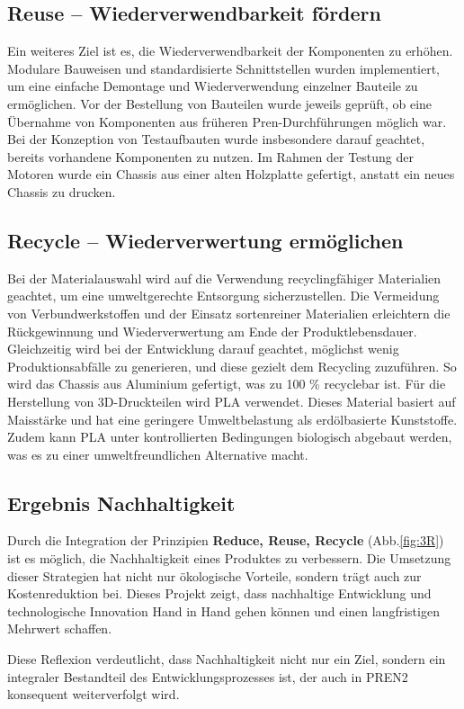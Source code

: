 \documentclass[../main.tex]{subfiles}
\begin{document}
\subsection{Reuse – Wiederverwendbarkeit fördern}

Ein weiteres Ziel ist es, die Wiederverwendbarkeit der Komponenten zu erhöhen. Modulare Bauweisen und standardisierte Schnittstellen wurden implementiert, um eine einfache Demontage und Wiederverwendung einzelner Bauteile zu ermöglichen. Vor der Bestellung von Bauteilen wurde jeweils geprüft, ob eine Übernahme von Komponenten aus früheren Pren-Durchführungen möglich war. Bei der Konzeption von Testaufbauten wurde insbesondere darauf geachtet, bereits vorhandene Komponenten zu nutzen. Im Rahmen der Testung der Motoren wurde ein Chassis aus einer alten Holzplatte gefertigt, anstatt ein neues Chassis zu drucken.

\subsection{Recycle – Wiederverwertung ermöglichen}

Bei der Materialauswahl wird auf die Verwendung recyclingfähiger Materialien geachtet, um eine umweltgerechte Entsorgung sicherzustellen. Die Vermeidung von Verbundwerkstoffen und der Einsatz sortenreiner Materialien erleichtern die Rückgewinnung und Wiederverwertung am Ende der Produktlebensdauer. Gleichzeitig wird bei der Entwicklung darauf geachtet, möglichst wenig Produktionsabfälle zu generieren, und diese gezielt dem Recycling zuzuführen. So wird das Chassis aus Aluminium gefertigt, was zu 100 \% recyclebar ist. Für die Herstellung von 3D-Druckteilen wird \gls{PLA} verwendet. Dieses Material basiert auf Maisstärke und hat eine geringere Umweltbelastung als erdölbasierte Kunststoffe. Zudem kann PLA unter kontrollierten Bedingungen biologisch abgebaut werden, was es zu einer umweltfreundlichen Alternative macht.

\subsection{Ergebnis Nachhaltigkeit}

Durch die Integration der Prinzipien \textbf{Reduce, Reuse, Recycle} (Abb.\ref{fig:3R}) ist es möglich, die Nachhaltigkeit eines Produktes zu verbessern. Die Umsetzung dieser Strategien hat nicht nur ökologische Vorteile, sondern trägt auch zur Kostenreduktion bei. Dieses Projekt zeigt, dass nachhaltige Entwicklung und technologische Innovation Hand in Hand gehen können und einen langfristigen Mehrwert schaffen.

Diese Reflexion verdeutlicht, dass Nachhaltigkeit nicht nur ein Ziel, sondern ein integraler Bestandteil des Entwicklungsprozesses ist, der auch in PREN2 konsequent weiterverfolgt wird.
\end{document}
